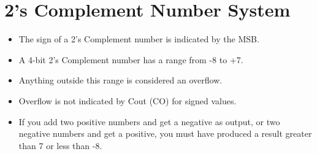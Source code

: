 \section*{2's Complement Number System}

\begin{itemize}
    \item The sign of a 2's Complement number is indicated by the MSB.
    \item A 4-bit 2's Complement number has a range from -8 to +7.
    \item Anything outside this range is considered an overflow.
    \item Overflow is not indicated by Cout (CO) for signed values.
    \item If you add two positive numbers and get a negative as output, or two negative numbers and get a positive, you must have produced a result greater than 7 or less than -8.
\end{itemize}

\documentclass{article}



